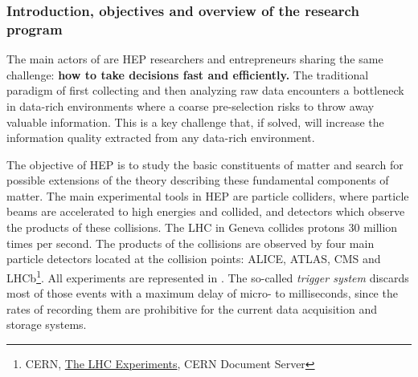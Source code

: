 
\subsubsection{Introduction, objectives and overview of the research program}
\label{sec:introRO}

The main actors of \acronym are HEP researchers and 
entrepreneurs %
sharing the same challenge: \textbf{how to take decisions fast and efficiently.}
The traditional paradigm of first collecting and then analyzing raw data encounters
a bottleneck in data-rich environments where a coarse pre-selection risks to throw away valuable information. This is 
a key challenge that, if solved, will increase the information quality 
extracted from any data-rich environment. 

The objective of HEP is to study the
basic constituents of matter and search for possible extensions of the
theory describing these fundamental components of matter. 
The main experimental tools in HEP
are particle colliders, where particle beams are accelerated to high energies 
and collided, and detectors which observe the products
of these collisions. 
The LHC in Geneva collides protons 30 million times per second. The 
products of the collisions are observed by four main particle detectors located at the
collision points: ALICE, ATLAS, CMS and LHCb\footnote{CERN, \href{http://cds.cern.ch/record/1997374}{The LHC Experiments},
CERN Document Server}. All experiments are represented in \acronym. 
The so-called \textit{trigger system} discards most of those events with a maximum
delay of micro- to milliseconds, since the
rates of recording them are prohibitive for the current data acquisition and 
storage systems. 


